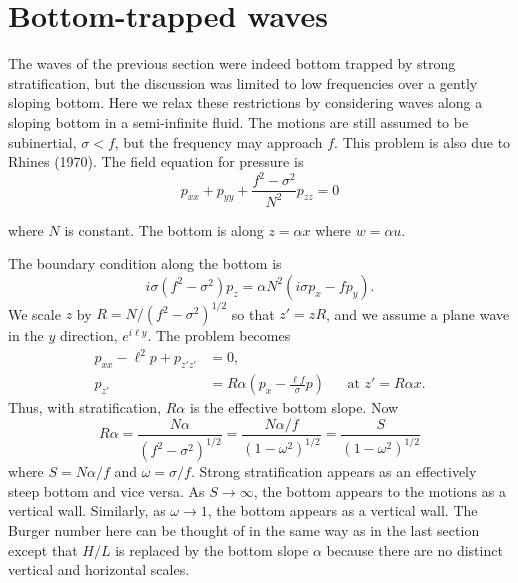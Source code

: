 \section{Bottom-trapped waves}

The waves of the previous section were indeed bottom trapped by strong stratification,
but the discussion was limited to low frequencies over a gently sloping bottom. Here
we relax these restrictions by considering waves along a sloping bottom in a
semi-infinite fluid. The motions are still assumed to be subinertial, $\sigma<f$, but
the frequency may approach $f$. This problem is also due to Rhines (1970). The field
equation for pressure is
\[
	p_{xx}+p_{yy}+\frac{f^2-\sigma^2}{N^2}p_{zz}=0
\]

\sourcepagebreak

where $N$ is constant. The bottom is along $z=\alpha x$ where $w=\alpha u$.


The boundary condition along the bottom is
\[
	i\sigma(f^2-\sigma^2)p_z
	=\alpha N^2(i\sigma p_x-fp_y).
\]
We scale $z$ by $R=N/(f^2-\sigma^2)^{1/2}$ so that $z'=zR$, and we assume a plane
wave in the $y$ direction, $e^{i\ell y}$. The problem becomes
\begin{align*}
	p_{xx}-\ell^2p+p_{z'z'} & =0,                                                                       \\
	p_{z'}                  & =R\alpha\left(p_x-\frac{\ell f}{\sigma}p\right)
	                        &                                                 & \text{at }z'=R\alpha x.
\end{align*}
Thus, with stratification, $R\alpha$ is the effective bottom slope. Now
\[
	R\alpha
	=\frac{N\alpha}{(f^2-\sigma^2)^{1/2}}
	=\frac{N\alpha/f}{(1-\omega^2)^{1/2}}
	=\frac{S}{(1-\omega^2)^{1/2}}
\]
where $S=N\alpha/f$ and $\omega=\sigma/f$. Strong stratification appears as an
effectively steep bottom and vice versa. As $S\to\infty$, the bottom appears to the
motions as a vertical wall. Similarly, as $\omega\to1$, the bottom appears as a
vertical wall. The Burger number here can be thought of in the same way as in the last
section except that $H/L$ is replaced by the bottom slope $\alpha$ because there are
no distinct vertical and horizontal scales.

